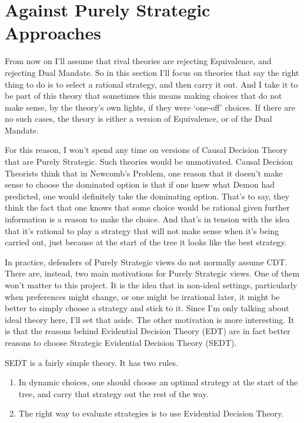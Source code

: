 \documentclass[
  12pt,
  letterpaper,
  DIV=11,
  numbers=noendperiod]{scrreprt}
\providecommand{\tightlist}{%
  \setlength{\itemsep}{0pt}\setlength{\parskip}{0pt}}\usepackage{longtable,booktabs,array}
\begin{document}
\hypertarget{sec-against-pure-strategy}{%
\section{Against Purely Strategic
Approaches}\label{sec-against-pure-strategy}}

From now on I'll assume that rival theories are rejecting Equivalence,
and rejecting Dual Mandate. So in this section I'll focus on theories
that say the right thing to do is to select a rational strategy, and
then carry it out. And I take it to be part of this theory that
sometimes this means making choices that do not make sense, by the
theory's own lights, if they were `one-off' choices. If there are no
such cases, the theory is either a version of Equivalence, or of the
Dual Mandate.

For this reason, I won't spend any time on versions of Causal Decision
Theory that are Purely Strategic. Such theories would be unmotivated.
Causal Decision Theorists think that in Newcomb's Problem, one reason
that it doesn't make sense to choose the dominated option is that if one
knew what Demon had predicted, one would definitely take the dominating
option. That's to say, they think the fact that one knows that some
choice would be rational given further information is a reason to make
the choice. And that's in tension with the idea that it's rational to
play a strategy that will not make sense when it's being carried out,
just because at the start of the tree it looks like the best strategy.

In practice, defenders of Purely Strategic views do not normally assume
CDT. There are, instead, two main motivations for Purely Strategic
views. One of them won't matter to this project. It is the idea that in
non-ideal settings, particularly when preferences might change, or one
might be irrational later, it might be better to simply choose a
strategy and stick to it. Since I'm only talking about ideal theory
here, I'll set that aside. The other motivation is more interesting. It
is that the reasons behind Evidential Decision Theory (EDT) are in fact
better reasons to choose Strategic Evidential Decision Theory (SEDT).

SEDT is a fairly simple theory. It has two rules.

\begin{enumerate}
\def\labelenumi{\arabic{enumi}.}
\tightlist
\item
  In dynamic choices, one should choose an optimal strategy at the start
  of the tree, and carry that strategy out the rest of the way.
\item
  The right way to evaluate strategies is to use Evidential Decision
  Theory.
\end{enumerate}
\end{document}
